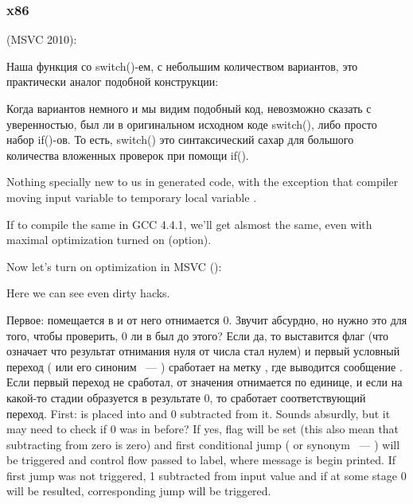 ﻿\subsubsection{x86}

 (MSVC 2010):



Наша функция со switch()-ем, с небольшим количеством вариантов, 
это практически аналог подобной конструкции:



Когда вариантов немного и мы видим подобный код, невозможно сказать с уверенностью, был ли
в оригинальном исходном коде switch(), либо просто набор if()-ов.
То есть, switch() это синтаксический сахар для большого количества вложенных проверок 
при помощи if().

{Nothing specially new to us in generated code, with the exception that compiler moving 
input variable 
 to temporary local variable .}

{If to compile the same in GCC 4.4.1, we'll get alsmost the same, even with maximal optimization 
turned on (\Othree option).}

{Now let's turn on optimization in} MSVC (\Ox): 



{Here we can see even dirty hacks.}

\IFRU
{Первое:  помещается в \EAX и от него отнимается 0. Звучит абсурдно, но нужно это для того, чтобы проверить, 
0 ли в \EAX был до этого? Если да, то выставится флаг \ZF (что означает что результат отнимания нуля от числа 
стал нулем) и первый условный переход \JE ( или его синоним \JZ ~--- ) 
сработает на метку , где выводится сообщение .
Если первый переход не сработал, от значения отнимается по единице, 
и если на какой-то стадии образуется в результате 0, то сработает соответствующий переход.}
{First:  is placed into \EAX and 0 subtracted from it. Sounds absurdly, but it may need to check if 
0 was in \EAX before? If yes, flag \ZF will be set (this also mean that subtracting from zero is zero) 
and first conditional jump \JE ( or synonym \JZ ~--- ) will be triggered 
and control flow passed to  label, where  message is begin printed. 
If first jump was not triggered, 1 subtracted from input value and if at some stage 0 will be resulted, 
corresponding jump will be triggered.}

